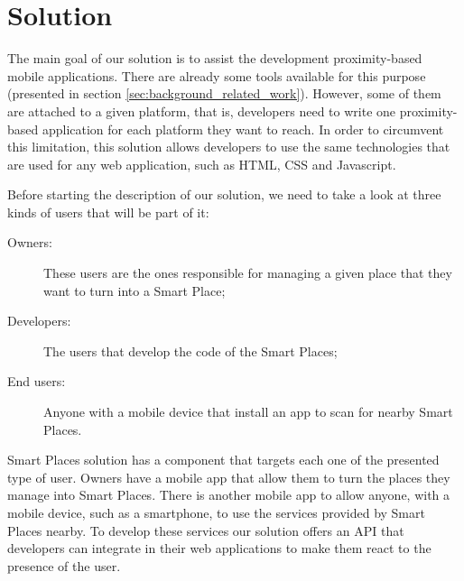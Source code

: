 
\section{Solution}
\label{sec:solution}
The main goal of our solution is to assist
the development proximity-based mobile applications.
There are already some tools available for this purpose (presented in section \ref{sec:background_related_work}).
However, some of them are attached to a given platform, that is, developers
need to write one proximity-based application for each platform they want
to reach.
In order to circumvent this limitation, this solution allows developers
to use the same technologies that are used for any web application, such as \gls{HTML}, \gls{CSS} and Javascript.

Before starting the description of our solution, we need to take a look at three kinds of users that will be part of it:
\begin{description}
  \item[Owners:] These users are the ones responsible for managing a given place that they want to turn into a Smart Place;
  \item[Developers:] The users that develop the code of the Smart Places;
  \item[End users:] Anyone with a mobile device that install an app to scan for nearby Smart Places.
\end{description}

Smart Places solution has a component that targets each one of the presented type of user.
Owners have a mobile app that allow them to turn the places they manage into Smart Places.
There is another mobile app to allow anyone, with a mobile device, such as a smartphone, to use the services provided by Smart Places nearby.
To develop these services our solution offers an \gls{API} that developers can integrate in their web applications to make them react to the presence of the user.

